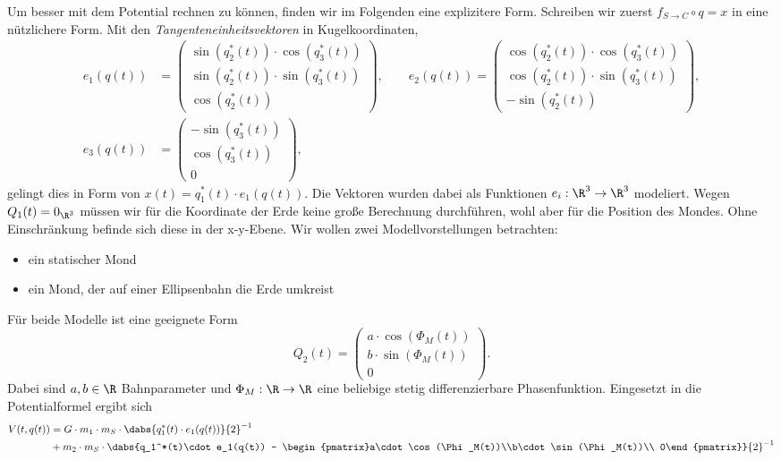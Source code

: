 \documentclass{subfiles}
\begin{document}
    Um besser mit dem Potential rechnen zu können, finden wir im Folgenden eine explizitere Form. Schreiben wir zuerst $f_{S\to C}\circ q = x$ in eine nützlichere Form. Mit den \textit{Tangenteneinheitsvektoren} in Kugelkoordinaten,
    \begin{align*}
        e_1(q(t)) &= \begin{pmatrix}\sin(q_2^*(t))\cdot\cos(q_3^*(t))\\ \sin(q_2^*(t))\cdot\sin(q_3^*(t))\\ \cos(q_2^*(t))\end{pmatrix},\qquad
        e_2(q(t)) = \begin{pmatrix}\cos(q_2^*(t))\cdot\cos(q_3^*(t))\\ \cos(q_2^*(t))\cdot\sin(q_3^*(t))\\ -\sin(q_2^*(t))\end{pmatrix},\\
        e_3(q(t)) &= \begin{pmatrix}-\sin(q_3^*(t))\\ \cos(q_3^*(t))\\ 0\end{pmatrix},
    \end{align*}
    gelingt dies in Form von $x(t) = q_1^*(t)\cdot e_1(q(t))$. Die Vektoren wurden dabei als Funktionen $e_i: \R^3\to \R^3$ modeliert. Wegen $Q_1(t)=0_{\R^3}$ müssen wir für die Koordinate der Erde keine große Berechnung durchführen, wohl aber für die Position des Mondes. Ohne Einschränkung befinde sich diese in der x-y-Ebene. Wir wollen zwei Modellvorstellungen betrachten:
    \begin{itemize}
        \item ein statischer Mond
        \item ein Mond, der auf einer Ellipsenbahn die Erde umkreist
    \end{itemize}
    Für beide Modelle ist eine geeignete Form
    \[
        Q_2(t) = \begin{pmatrix}a\cdot\cos(\Phi_M(t))\\b\cdot \sin(\Phi_M(t))\\ 0\end{pmatrix}.
    \]
    Dabei sind $a,b\in\R$ Bahnparameter und $\Phi_M: \R\to \R$ eine beliebige stetig differenzierbare Phasenfunktion. Eingesetzt in die Potentialformel ergibt sich
    \begin{align*}
        V(t,q(t)) &= G\cdot m_1\cdot m_S\cdot \dabs{q_1^*(t)\cdot e_1(q(t))}{2}^{-1}\\
        &+ m_2\cdot m_S\cdot\dabs{q_1^*(t)\cdot e_1(q(t)) - \begin{pmatrix}a\cdot\cos(\Phi_M(t))\\b\cdot \sin(\Phi_M(t))\\ 0\end{pmatrix}}{2}^{-1}
    \end{align*}
\end{document}
